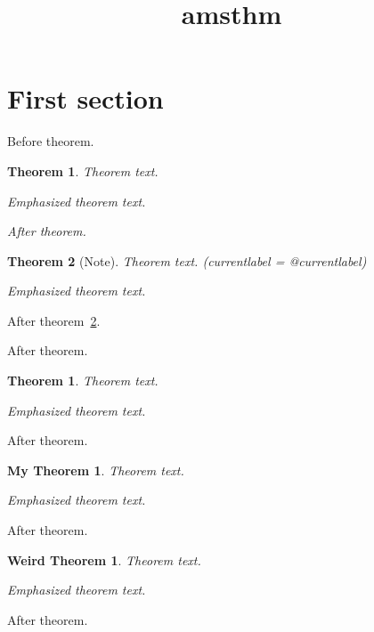 \documentclass{amsart}
\title{amsthm}
\newtheorem{theorem}{Theorem}[section]
\newtheorem*{theorem*}{Theorem}
\theoremstyle{mystyle}
\newtheorem{mytheorem}{My Theorem}
\theoremstyle{weird}
\newtheorem{weirdtheorem}{Weird Theorem}
\begin{document}
\maketitle

\section{First section}

Before theorem.

\begin{theorem}
Theorem text.

Emphasized \emph{theorem} text.
\end{theorem}

{\it After theorem.}

\begin{theorem}[Note]\label{labeled}\it
Theorem text. (currentlabel = \csname @currentlabel\endcsname)

Emphasized \emph{theorem} text.
\end{theorem}

After theorem~\ref{labeled}.

After theorem.

\begin{theorem*}
Theorem text.

Emphasized \emph{theorem} text.
\end{theorem*}

After theorem.

\begin{mytheorem}
Theorem text.

Emphasized \emph{theorem} text.
\end{mytheorem}

After theorem.

\begin{weirdtheorem}
Theorem text.

Emphasized \emph{theorem} text.
\end{weirdtheorem}

After theorem.
\end{document}

